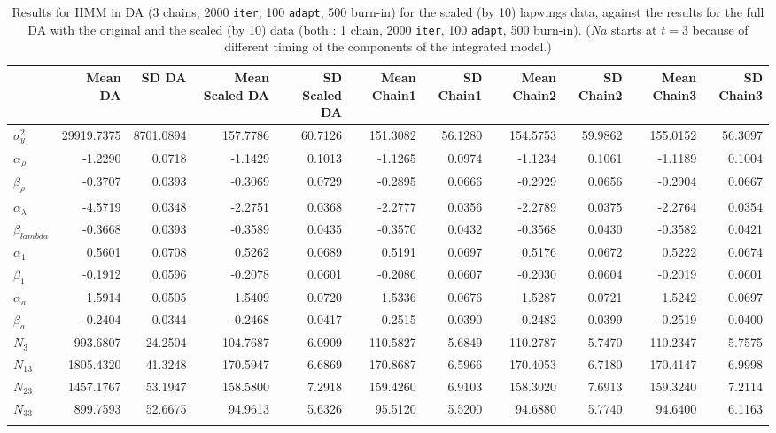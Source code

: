 \begin{landscape} 
\begin{table}
\begin{tabular}{l| rr rr |rr rr rr }
&Mean DA  & SD DA  & Mean Scaled DA  & SD Scaled DA  & Mean Chain1  & SD Chain1  & Mean Chain2  & SD Chain2  & Mean Chain3  & SD Chain3  \\ \hline 
 $\sigma_{y}^{2}$  & 29919.7375  & 8701.0894  & 157.7786  & 60.7126  & 151.3082  & 56.1280  & 154.5753  & 59.9862  & 155.0152  & 56.3097  \\ 
 $\alpha_{\rho}$  & -1.2290  & 0.0718  & -1.1429  & 0.1013  & -1.1265  & 0.0974  & -1.1234  & 0.1061  & -1.1189  & 0.1004  \\ 
 $\beta_{\rho}$  & -0.3707  & 0.0393  & -0.3069  & 0.0729  & -0.2895  & 0.0666  & -0.2929  & 0.0656  & -0.2904  & 0.0667  \\ 
 $\alpha_{\lambda}$  & -4.5719  & 0.0348  & -2.2751  & 0.0368  & -2.2777  & 0.0356  & -2.2789  & 0.0375  & -2.2764  & 0.0354  \\ 
 $\beta_{lambda}$  & -0.3668  & 0.0393  & -0.3589  & 0.0435  & -0.3570  & 0.0432  & -0.3568  & 0.0430  & -0.3582  & 0.0421  \\ 
 $\alpha_{1}$  & 0.5601  & 0.0708  & 0.5262  & 0.0689  & 0.5191  & 0.0697  & 0.5176  & 0.0672  & 0.5222  & 0.0674  \\ 
 $\beta_{1}$  & -0.1912  & 0.0596  & -0.2078  & 0.0601  & -0.2086  & 0.0607  & -0.2030  & 0.0604  & -0.2019  & 0.0601  \\ 
 $\alpha_{a}$  & 1.5914  & 0.0505  & 1.5409  & 0.0720  & 1.5336  & 0.0676  & 1.5287  & 0.0721  & 1.5242  & 0.0697  \\ 
 $\beta_{a}$  & -0.2404  & 0.0344  & -0.2468  & 0.0417  & -0.2515  & 0.0390  & -0.2482  & 0.0399  & -0.2519  & 0.0400  \\ 
 $N_{3}$  & 993.6807  & 24.2504  & 104.7687  & 6.0909  & 110.5827  & 5.6849  & 110.2787  & 5.7470  & 110.2347  & 5.7575  \\ 
 $N_{13}$  & 1805.4320  & 41.3248  & 170.5947  & 6.6869  & 170.8687  & 6.5966  & 170.4053  & 6.7180  & 170.4147  & 6.9998  \\ 
 $N_{23}$  & 1457.1767  & 53.1947  & 158.5800  & 7.2918  & 159.4260  & 6.9103  & 158.3020  & 7.6913  & 159.3240  & 7.2114  \\ 
 $N_{33}$  & 899.7593  & 52.6675  & 94.9613  & 5.6326  & 95.5120  & 5.5200  & 94.6880  & 5.7740  & 94.6400  & 6.1163  \\ 
 \\ \hline \hline
\end{tabular}
\caption{Results for HMM in DA (3 chains, 2000 \texttt{iter},  100 \texttt{adapt}, 500 burn-in) 
for the scaled (by 10) lapwings data, against the results for the full DA 
with the original and the scaled (by 10) data (both : 1 chain, 2000 \texttt{iter}, 100 \texttt{adapt}, 500 burn-in). 
($Na$ starts at $t=3$ because of different timing of the components of the integrated model.)}
\end{table}
\end{landscape} 
